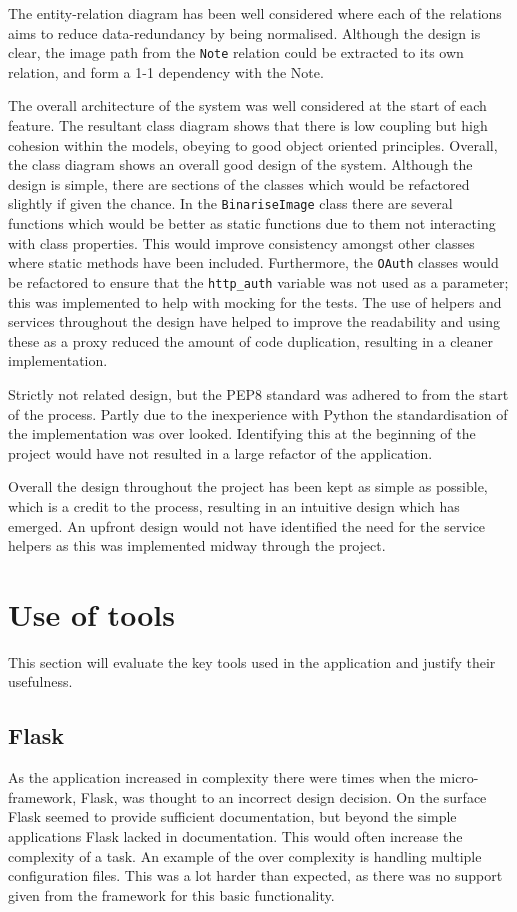 The entity-relation diagram has been well considered where each of the relations aims to reduce data-redundancy by being normalised. Although the design is clear, the image path from the \texttt{Note} relation could be extracted to its own relation, and form a 1-1 dependency with the Note.

The overall architecture of the system was well considered at the start of each feature. The resultant class diagram shows that there is low coupling but high cohesion within the models, obeying to good object oriented principles. Overall, the class diagram shows an overall good design of the system. Although the design is simple, there are sections of the classes which would be refactored slightly if given the chance. In the \texttt{BinariseImage} class there are several functions which would be better as static functions due to them not interacting with class properties. This would improve consistency amongst other classes where static methods have been included. Furthermore, the \texttt{OAuth} classes would be refactored to ensure that the \texttt{http\_auth} variable was not used as a parameter; this was implemented to help with mocking for the tests. The use of helpers and services throughout the design have helped to improve the readability and using these as a proxy reduced the amount of code duplication, resulting in a cleaner implementation.

Strictly not related design, but the PEP8 standard \cite{citeulike:1402014} was adhered to from the start of the process. Partly due to the inexperience with Python the standardisation of the implementation was over looked. Identifying this at the beginning of the project would have not resulted in a large refactor of the application.

Overall the design throughout the project has been kept as simple as possible, which is a credit to the process, resulting in an intuitive design which has emerged. An upfront design would not have identified the need for the service helpers as this was implemented midway through the project.

\section{Use of tools}
This section will evaluate the key tools used in the application and justify their usefulness.

\subsection{Flask}
As the application increased in complexity there were times when the micro-framework, Flask, was thought to an incorrect design decision. On the surface Flask seemed to provide sufficient documentation, but beyond the simple applications Flask lacked in documentation. This would often increase the complexity of a task. An example of the over complexity is handling multiple configuration files. This was a lot harder than expected, as there was no support given from the framework for this basic functionality.

